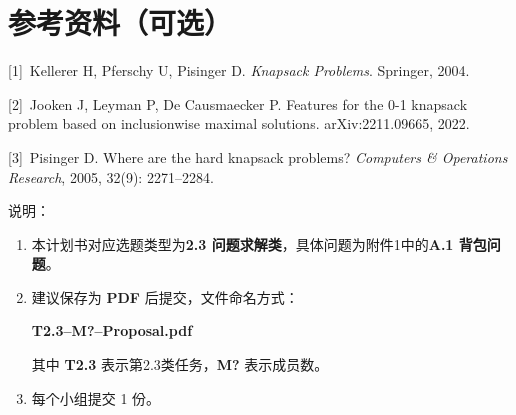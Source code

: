 \documentclass[6pt,a4paper]{ctexart}
\begin{document}
\section{参考资料（可选）}

\noindent
{[1]}~Kellerer H, Pferschy U, Pisinger D. \textit{Knapsack Problems}. Springer, 2004.

\noindent
{[2]}~Jooken J, Leyman P, De Causmaecker P. Features for the 0-1 knapsack problem based on inclusionwise maximal solutions. arXiv:2211.09665, 2022.

\noindent
{[3]}~Pisinger D. Where are the hard knapsack problems? \textit{Computers \& Operations Research}, 2005, 32(9): 2271--2284.

\vspace{0.8cm}

\noindent
说明：

\begin{enumerate}[leftmargin=2.5em,itemsep=0.25em]
  \item 本计划书对应选题类型为\textbf{2.3 问题求解类}，具体问题为附件1中的\textbf{A.1 背包问题}。
  \item 建议保存为 \textbf{PDF} 后提交，文件命名方式：

  \qquad \textbf{T2.3--M?--Proposal.pdf}

  \qquad 其中 \textbf{T2.3} 表示第2.3类任务，\textbf{M?} 表示成员数。
  \item 每个小组提交 1 份。
\end{enumerate}
\end{document}
